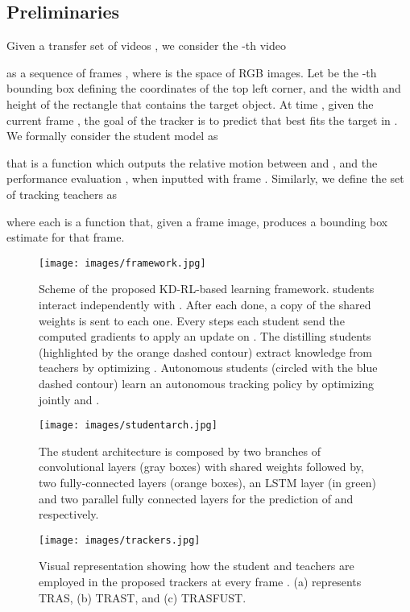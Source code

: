 \documentclass[runningheads]{llncs}
\makeatletter
\def\myalgonamefirst{TRAS\@\xspace}
\def\myalgonamesecond{TRAST\@\xspace}
\def\myalgonamethird{TRASFUST\@\xspace}
\makeatother
\begin{document}
\subsection{Preliminaries} 
Given a transfer set of videos , we consider the -th video

as a sequence of frames , where  is the space of RGB images. 
 Let  be the -th bounding box defining the coordinates of the top left corner, and the width and height of the rectangle that contains the target object.
At time , given the current frame , the goal of the tracker is to predict  that best fits the target in .
We formally consider the student model as 

that is a function which outputs the relative motion between  and , and the performance evaluation , when inputted with frame .
Similarly, we define the set of tracking teachers as

where each  is a function that, given a frame image, produces a bounding box estimate for that frame.

\begin{figure}[t]\centering
\begin{minipage}[b]{.49\textwidth}
\centering
\texttt{[image: images/framework.jpg]}
\caption{Scheme of the proposed KD-RL-based learning framework.  students interact independently with . After each  done, a copy  of the shared weights  is sent to each one. Every  steps each student send the computed gradients to apply an update on . The distilling students (highlighted by the orange dashed contour) extract knowledge from teachers  by optimizing . Autonomous students (circled with the blue dashed contour) learn an autonomous tracking policy by optimizing jointly  and .}
\label{fig:framework}
\end{minipage}\hfill
\begin{minipage}[b]{.49\textwidth}
\centering
\texttt{[image: images/studentarch.jpg]}
   \caption{The student architecture is composed by two branches of convolutional layers (gray boxes) with shared weights followed by, two fully-connected layers (orange boxes), an LSTM layer (in green) and two parallel fully connected layers for the prediction of  and   respectively.}
\label{fig:arch}
\texttt{[image: images/trackers.jpg]}
\caption{Visual representation showing how the student and teachers are employed in the proposed trackers at every frame . (a) represents \myalgonamefirst, (b) \myalgonamesecond, and (c) \myalgonamethird.}
\label{fig:trackers}
\end{minipage}
\end{figure}
\end{document}
